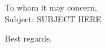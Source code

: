 \documentclass[11pt,a4paper,sans]{moderncv}
\begin{document}
\clearpage

\recipient{~}{}

\date{February 10, 9021} %

\opening{To whom it may concern,\\[2.0em] Subject: SUBJECT HERE} %

\closing{Best regards,}


\makelettertitle %


\begin{justify}

\lipsum[1-3] %

\end{justify}


\makeletterclosing %
\end{document}
